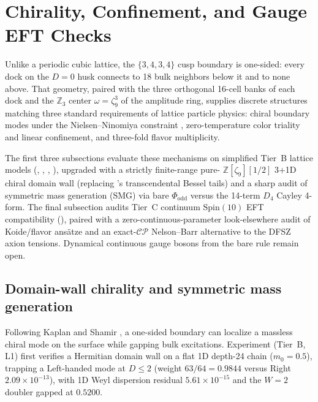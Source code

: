\section{Chirality, Confinement, and Gauge EFT Checks}
\label{sec:gauge}

Unlike a periodic cubic lattice, the $\{3,4,3,4\}$ cusp boundary is one-sided: every dock on the $D = 0$ husk connects
to 18 bulk neighbors below it and to none above. That geometry, paired with the three orthogonal 16-cell banks of each
dock and the $\mathbb{Z}_3$ center $\omega = \zeta_9^3$ of the amplitude ring, supplies discrete structures matching
three standard requirements of lattice particle physics: chiral boundary modes under the Nielsen--Ninomiya constraint
\cite{nielsen1981}, zero-temperature color triality and linear confinement, and three-fold flavor multiplicity.

The first three subsections evaluate these mechanisms on simplified Tier~B lattice models (,
, , ), upgraded with a strictly finite-range pure-
$\mathbb{Z}[\zeta_9][1/2]$ 3+1D chiral domain wall (replacing 's transcendental Bessel tails) and a
sharp audit of symmetric mass generation (SMG) via bare $\Phi_{\mathrm{odd}}$ versus the 14-term $D_4$ Cayley 4-form.
The final subsection audits Tier~C continuum $\mathrm{Spin}(10)$ EFT compatibility (),
paired with a zero-continuous-parameter look-elsewhere audit of Koide/flavor ans\"atze and an exact-$\mathcal{CP}$
Nelson--Barr alternative to the DFSZ axion tensions. Dynamical continuous gauge bosons from the bare rule remain open.

\subsection{Domain-wall chirality and symmetric mass generation}

Following Kaplan and Shamir \cite{kaplan1992, shamir1993}, a one-sided boundary can localize a massless chiral mode on
the surface while gapping bulk excitations. Experiment  (Tier~B, L1) first verifies a Hermitian domain
wall on a flat 1D depth-24 chain ($m_0 = 0.5$), trapping a Left-handed mode at $D \le 2$ (weight $63/64 = 0.9844$
versus Right $2.09 \times 10^{-13}$), with 1D Weyl dispersion residual $5.61 \times 10^{-15}$ and the $W = 2$ doubler
gapped at $0.5200$.

